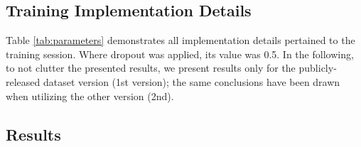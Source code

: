 \documentclass[10pt,twocolumn,letterpaper]{article}
\begin{document}
\subsection{Training Implementation Details}
 
  
 
 
Table \ref{tab:parameters} demonstrates all implementation details pertained to the training session. Where dropout \cite{srivastava2014dropout} was applied, its value was 0.5. In the following, to not clutter the presented results, we present results only for the publicly-released dataset version (1st version); the same conclusions have been drawn when utilizing the other version (2nd). 
 

 
\begin{table}[h]
\caption{Training parameters with their corresponding values}
\setlength{\tabcolsep}{12pt}
\centering
{}
\label{tab:parameters}
\end{table} 
 



\subsection{Results}
\end{document}
